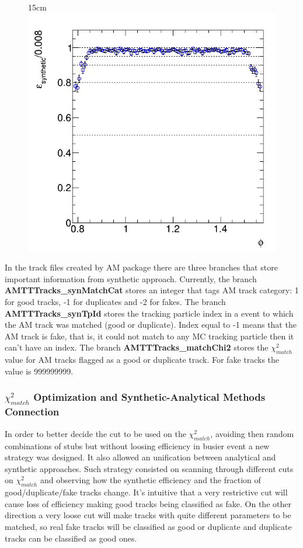 \begin{figure}[htbp]{15cm}
	\includegraphics[scale=0.23]{AppendixCMSL1TT/figs/single_muon_nopu_tcat/am_tracks_reco_eff_vs_phi_allogics_nodupremoval}
	\label{fig:track_cat_eff_muon_no_pu}
\end{figure}

In the track files created by AM package there are three branches that store important information from synthetic approach. Currently, the branch \textbf{AMTTTracks\_synMatchCat} stores an integer that tags AM track category: 1 for good tracks, -1 for duplicates and -2 for fakes. The branch \textbf{AMTTTracks\_synTpId} stores the tracking particle index in a event to which the AM track was matched (good or duplicate). Index equal to -1 means that the AM track is fake, that is, it could not match to any MC tracking particle then it can't have an index. The branch \textbf{AMTTTracks\_matchChi2} stores the $\chi^{2}_{match}$ value for AM tracks flagged as a good or duplicate track. For fake tracks the value is 999999999.

\subsubsection{$\chi^{2}_{match}$ Optimization and Synthetic-Analytical Methods Connection}
In order to better decide the cut to be used on the $\chi^{2}_{match}$, avoiding then random combinations of stubs but without loosing efficiency in busier event a new strategy was designed. It also allowed an unification between analytical and synthetic approaches. Such strategy consisted on scanning through different cuts on $\chi^{2}_{match}$ and observing how the synthetic efficiency and the fraction of good/duplicate/fake tracks change. It's intuitive that a very restrictive cut will cause loss of efficiency making good tracks being classified as fake. On the other direction a very loose cut will make tracks with quite different parameters to be matched, so real fake tracks will be classified as good or duplicate and duplicate tracks can be classified as good ones. 

